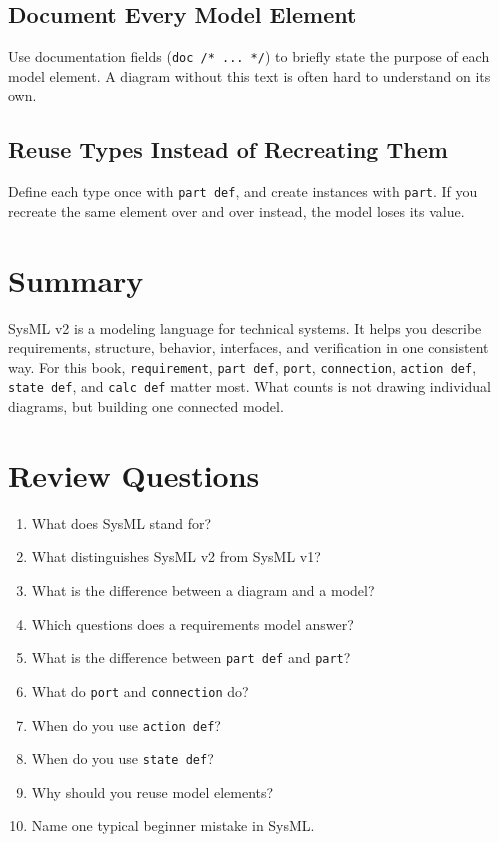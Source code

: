 \subsection{Document Every Model Element}
Use documentation fields (\texttt{doc /* ... */}) to briefly state the purpose of each model element. A diagram without this text is often hard to understand on its own.

\subsection{Reuse Types Instead of Recreating Them}
Define each type once with \texttt{part def}, and create instances with \texttt{part}. If you recreate the same element over and over instead, the model loses its value.

\section{Summary}
SysML v2 is a modeling language for technical systems. It helps you describe requirements, structure, behavior, interfaces, and verification in one consistent way. For this book, \texttt{requirement}, \texttt{part def}, \texttt{port}, \texttt{connection}, \texttt{action def}, \texttt{state def}, and \texttt{calc def} matter most. What counts is not drawing individual diagrams, but building one connected model.

\section{Review Questions}
\begin{enumerate}
    \item What does SysML stand for?
    \item What distinguishes SysML v2 from SysML v1?
    \item What is the difference between a diagram and a model?
    \item Which questions does a requirements model answer?
    \item What is the difference between \texttt{part def} and \texttt{part}?
    \item What do \texttt{port} and \texttt{connection} do?
    \item When do you use \texttt{action def}?
    \item When do you use \texttt{state def}?
    \item Why should you reuse model elements?
    \item Name one typical beginner mistake in SysML.
\end{enumerate}

